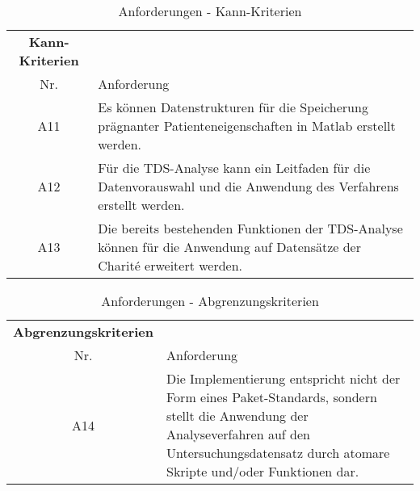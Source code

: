 \begin{table}[H] 
\begin{tabularx}{\textwidth}{cllX}
\toprule
\multicolumn{3}{c}{\textbf{Kann-Kriterien}} & \\  
\cmidrule{1-3}
\multicolumn{3}{c}{Nr.} & Anforderung\\ 
\midrule 
\multicolumn{3}{c}{A11} & Es können Datenstrukturen für die Speicherung prägnanter Patienteneigenschaften in Matlab erstellt werden.\\
\multicolumn{3}{c}{A12} & Für die \acs{TDS}-Analyse kann ein Leitfaden für die Datenvorauswahl und die Anwendung des Verfahrens erstellt werden.\\ 
\multicolumn{3}{c}{A13} & Die bereits bestehenden Funktionen der \acs{TDS}-Analyse können für die Anwendung auf Datensätze der Charit\'{e} erweitert werden.\\ 
\bottomrule
\end{tabularx}
\caption{Anforderungen - Kann-Kriterien}
\label{tab:Kann-Kriterien}
\end{table}


\begin{table}[H] 
\begin{tabularx}{\textwidth}{cllX}
\toprule
\multicolumn{3}{c}{\textbf{Abgrenzungskriterien}} & \\  
\cmidrule{1-3}
\multicolumn{3}{c}{Nr.} & Anforderung\\ 
\midrule 
\multicolumn{3}{c}{A14} &  Die Implementierung entspricht nicht der Form eines Paket-Standards, sondern stellt die Anwendung der Analyseverfahren auf den Untersuchungsdatensatz durch atomare Skripte und/oder Funktionen dar.\\
\bottomrule
\end{tabularx}
\caption{Anforderungen - Abgrenzungskriterien}
\label{tab:Abgr-Kriterien}
\end{table}
